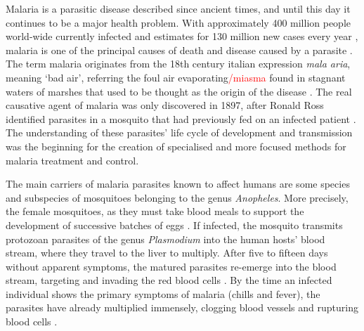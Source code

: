 Malaria is a parasitic disease described since ancient times, and until this day it continues to be a major health problem.
With approximately 400 million people world-wide currently infected and estimates for 130 million new cases every year \cite{perlmann2002malaria}, malaria is one of the principal causes of death and disease caused by a parasite \cite{vitoria2009global}.
The term malaria originates from the 18th century italian expression \textit{mala aria}, meaning `bad air', referring the foul air evaporating\textcolor{red}{/miasma} found in stagnant waters of marshes that used to be thought as the origin of the disease \cite{warrell2002essential}.
The real causative agent of malaria was only discovered in 1897, after Ronald Ross identified parasites in a mosquito that had previously fed on an infected patient \cite{ross1897observations}.
The understanding of these parasites' life cycle of development and transmission was the beginning for the creation of specialised and more focused methods for malaria treatment and control.

The main carriers of malaria parasites known to affect humans are some species and subspecies of mosquitoes belonging to the genus \textit{Anopheles}.
More precisely, the female mosquitoes, as they must take blood meals to support the development of successive batches of eggs \cite{who2017framework}.
If infected, the mosquito transmits protozoan parasites of the genus \textit{Plasmodium} into the human hosts' blood stream, where they travel to the liver to multiply.
After five to fifteen days without apparent symptoms, the matured parasites re-emerge into the blood stream, targeting and invading the red blood cells \cite{who2017framework}.
By the time an infected individual shows the primary symptoms of malaria (chills and fever), the parasites have already multiplied immensely, clogging blood vessels and rupturing blood cells \cite{warrell2002essential}.



